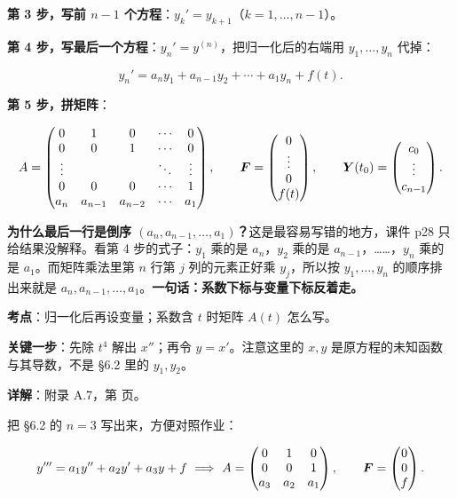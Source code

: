 \documentclass[11pt]{ctexart}
\renewcommand{\qbreak}{\needspace{0.26\textheight}}
\newcommand{\mat}[1]{\begin{pmatrix}#1\end{pmatrix}}
\begin{document}
\textbf{第 3 步，写前 $n-1$ 个方程}：$y_k'=y_{k+1}$（$k=1,\dots,n-1$）。

\textbf{第 4 步，写最后一个方程}：$y_n'=y^{(n)}$，把归一化后的右端用 $y_1,\dots,y_n$ 代掉：

\[
y_n'=a_n y_1+a_{n-1}y_2+\cdots+a_1y_n+f(t).
\]

\textbf{第 5 步，拼矩阵}：

\[
A=\begin{pmatrix}
0&1&0&\cdots&0\\
0&0&1&\cdots&0\\
\vdots& & &\ddots&\vdots\\
0&0&0&\cdots&1\\
a_n&a_{n-1}&a_{n-2}&\cdots&a_1
\end{pmatrix},
\qquad
\vect{F}=\mat{0\\ \vdots\\ 0\\ f(t)},\qquad
\vect{Y}(t_0)=\mat{c_0\\ \vdots\\ c_{n-1}}.
\]

\textbf{为什么最后一行是倒序 $(a_n,a_{n-1},\dots,a_1)$？}这是最容易写错的地方，课件 p28 只给结果没解释。看第 4 步的式子：$y_1$ 乘的是 $a_n$，$y_2$ 乘的是 $a_{n-1}$，……，$y_n$ 乘的是 $a_1$。而矩阵乘法里第 $n$ 行第 $j$ 列的元素正好乘 $y_j$，所以按 $y_1,\dots,y_n$ 的顺序排出来就是 $a_n,a_{n-1},\dots,a_1$。\textbf{一句话：系数下标与变量下标反着走。}


\qbreak
{}
\par\textbf{考点}：归一化后再设变量；系数含 $t$ 时矩阵 $A(t)$ 怎么写。
\par\textbf{关键一步}：先除 $t^4$ 解出 $x''$；再令 $y=x'$。注意这里的 $x,y$ 是原方程的未知函数与其导数，不是 §6.2 里的 $y_1,y_2$。
\par\textbf{详解}：附录 A.7，第 \pageref{app:a7} 页。


把 §6.2 的 $n=3$ 写出来，方便对照作业：

\[
y'''=a_1y''+a_2y'+a_3y+f
\ \Longrightarrow\
A=\mat{0&1&0\\0&0&1\\ a_3&a_2&a_1},\qquad \vect{F}=\mat{0\\0\\f}.
\]
\end{document}
